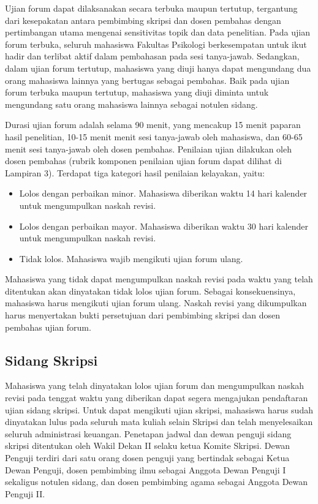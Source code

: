 \documentclass[
  indonesian,
  letterpaper,
]{scrbook}
\providecommand{\tightlist}{%
  \setlength{\itemsep}{0pt}\setlength{\parskip}{0pt}}
\begin{document}
Ujian forum dapat dilaksanakan secara terbuka maupun tertutup,
tergantung dari kesepakatan antara pembimbing skripsi dan dosen pembahas
dengan pertimbangan utama mengenai sensitivitas topik dan data
penelitian. Pada ujian forum terbuka, seluruh mahasiswa Fakultas
Psikologi berkesempatan untuk ikut hadir dan terlibat aktif dalam
pembahasan pada sesi tanya-jawab. Sedangkan, dalam ujian forum tertutup,
mahasiswa yang diuji hanya dapat mengundang dua orang mahasiswa lainnya
yang bertugas sebagai pembahas. Baik pada ujian forum terbuka maupun
tertutup, mahasiswa yang diuji diminta untuk mengundang satu orang
mahasiswa lainnya sebagai notulen sidang.

Durasi ujian forum adalah selama 90 menit, yang mencakup 15 menit
paparan hasil penelitian, 10-15 menit menit sesi tanya-jawab oleh
mahasiswa, dan 60-65 menit sesi tanya-jawab oleh dosen pembahas.
Penilaian ujian dilakukan oleh dosen pembahas (rubrik komponen penilaian
ujian forum dapat dilihat di Lampiran 3). Terdapat tiga kategori hasil
penilaian kelayakan, yaitu:

\begin{itemize}
\tightlist
\item
  Lolos dengan perbaikan minor. Mahasiswa diberikan waktu 14 hari
  kalender untuk mengumpulkan naskah revisi.
\item
  Lolos dengan perbaikan mayor. Mahasiswa diberikan waktu 30 hari
  kalender untuk mengumpulkan naskah revisi.
\item
  Tidak lolos. Mahasiswa wajib mengikuti ujian forum ulang.
\end{itemize}

Mahasiswa yang tidak dapat mengumpulkan naskah revisi pada waktu yang
telah ditentukan akan dinyatakan tidak lolos ujian forum. Sebagai
konsekuensinya, mahasiswa harus mengikuti ujian forum ulang. Naskah
revisi yang dikumpulkan harus menyertakan bukti persetujuan dari
pembimbing skripsi dan dosen pembahas ujian forum.

\subsection*{Sidang Skripsi}\label{sidang-skripsi}

Mahasiswa yang telah dinyatakan lolos ujian forum dan mengumpulkan
naskah revisi pada tenggat waktu yang diberikan dapat segera mengajukan
pendaftaran ujian sidang skripsi. Untuk dapat mengikuti ujian skripsi,
mahasiswa harus sudah dinyatakan lulus pada seluruh mata kuliah selain
Skripsi dan telah menyelesaikan seluruh administrasi keuangan. Penetapan
jadwal dan dewan penguji sidang skripsi ditentukan oleh Wakil Dekan II
selaku ketua Komite Skripsi. Dewan Penguji terdiri dari satu orang dosen
penguji yang bertindak sebagai Ketua Dewan Penguji, dosen pembimbing
ilmu sebagai Anggota Dewan Penguji I sekaligus notulen sidang, dan dosen
pembimbing agama sebagai Anggota Dewan Penguji II.
\end{document}
